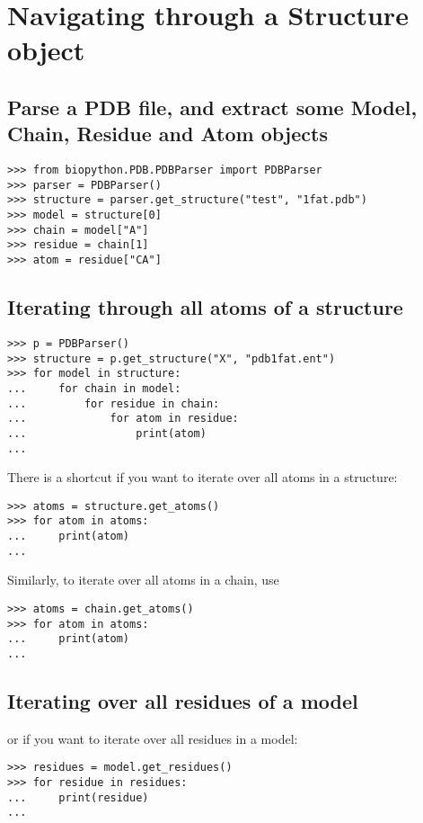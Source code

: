 \section{Navigating through a Structure object}

\subsection*{Parse a PDB file, and extract some Model, Chain, Residue and Atom objects}

\begin{verbatim}
>>> from biopython.PDB.PDBParser import PDBParser
>>> parser = PDBParser()
>>> structure = parser.get_structure("test", "1fat.pdb")
>>> model = structure[0]
>>> chain = model["A"]
>>> residue = chain[1]
>>> atom = residue["CA"]
\end{verbatim}

\subsection*{Iterating through all atoms of a structure}

\begin{verbatim}
>>> p = PDBParser()
>>> structure = p.get_structure("X", "pdb1fat.ent")
>>> for model in structure:
...     for chain in model:
...         for residue in chain:
...             for atom in residue:
...                 print(atom)
...
\end{verbatim}

There is a shortcut if you want to iterate over all atoms in a structure:
\begin{verbatim}
>>> atoms = structure.get_atoms()
>>> for atom in atoms:
...     print(atom)
...
\end{verbatim}

Similarly, to iterate over all atoms in a chain, use
\begin{verbatim}
>>> atoms = chain.get_atoms()
>>> for atom in atoms:
...     print(atom)
...
\end{verbatim}

\subsection*{Iterating over all residues of a model}

or if you want to iterate over all residues in a model:
\begin{verbatim}
>>> residues = model.get_residues()
>>> for residue in residues:
...     print(residue)
...
\end{verbatim}

